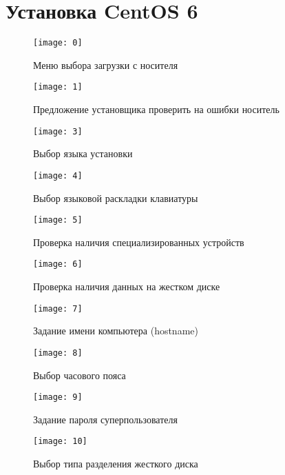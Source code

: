 \section{Установка CentOS 6} \label{pril:a}

\begin{figure}[ht]
    \centering
	\texttt{[image: 0]}
	\caption{Меню выбора загрузки с носителя}
\end{figure}

\begin{figure}[ht]
    \centering
	\texttt{[image: 1]}
	\caption{Предложение установщика проверить на ошибки носитель}
\end{figure}

\begin{figure}[ht]
    \centering
	\texttt{[image: 3]}
	\caption{Выбор языка установки}
\end{figure}

\begin{figure}[ht]
    \centering
	\texttt{[image: 4]}
	\caption{Выбор языковой раскладки клавиатуры}
\end{figure}

\begin{figure}[ht]
    \centering
	\texttt{[image: 5]}
	\caption{Проверка наличия специализированных устройств}
\end{figure}

\begin{figure}[ht]
    \centering
	\texttt{[image: 6]}
	\caption{Проверка наличия данных на жестком диске}
\end{figure}

\begin{figure}[ht]
    \centering
	\texttt{[image: 7]}
	\caption{Задание имени компьютера (hostname)}
\end{figure}

\begin{figure}[ht]
    \centering
	\texttt{[image: 8]}
	\caption{Выбор часового пояса}
\end{figure}

\begin{figure}[ht]
    \centering
	\texttt{[image: 9]}
	\caption{Задание пароля суперпользователя}
\end{figure}

\begin{figure}[ht]
    \centering
	\texttt{[image: 10]}
	\caption{Выбор типа разделения жесткого диска}
\end{figure}

